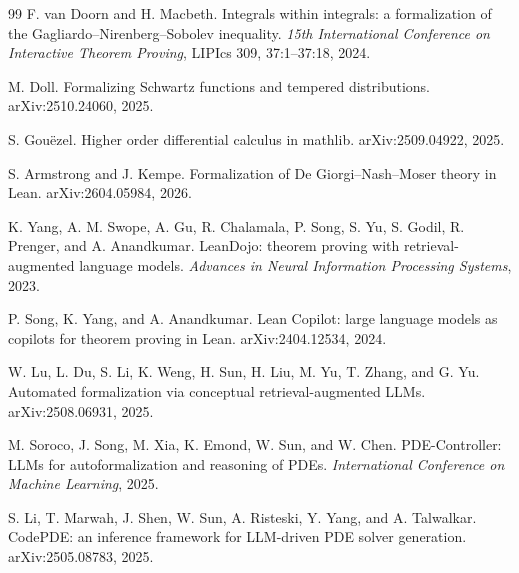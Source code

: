\documentclass[11pt]{article}
\theoremstyle{plain}
\theoremstyle{definition}
\theoremstyle{remark}
\begin{document}
\begin{thebibliography}{99}
F. van Doorn and H. Macbeth.
Integrals within integrals: a formalization of the Gagliardo--Nirenberg--Sobolev inequality.
\emph{15th International Conference on Interactive Theorem Proving}, LIPIcs 309, 37:1--37:18, 2024.

M. Doll.
Formalizing Schwartz functions and tempered distributions.
arXiv:2510.24060, 2025.

S. Gou\"ezel.
Higher order differential calculus in mathlib.
arXiv:2509.04922, 2025.

S. Armstrong and J. Kempe.
Formalization of De Giorgi--Nash--Moser theory in Lean.
arXiv:2604.05984, 2026.

K. Yang, A. M. Swope, A. Gu, R. Chalamala, P. Song, S. Yu, S. Godil, R. Prenger, and A. Anandkumar.
LeanDojo: theorem proving with retrieval-augmented language models.
\emph{Advances in Neural Information Processing Systems}, 2023.

P. Song, K. Yang, and A. Anandkumar.
Lean Copilot: large language models as copilots for theorem proving in Lean.
arXiv:2404.12534, 2024.

W. Lu, L. Du, S. Li, K. Weng, H. Sun, H. Liu, M. Yu, T. Zhang, and G. Yu.
Automated formalization via conceptual retrieval-augmented LLMs.
arXiv:2508.06931, 2025.

M. Soroco, J. Song, M. Xia, K. Emond, W. Sun, and W. Chen.
PDE-Controller: LLMs for autoformalization and reasoning of PDEs.
\emph{International Conference on Machine Learning}, 2025.

S. Li, T. Marwah, J. Shen, W. Sun, A. Risteski, Y. Yang, and A. Talwalkar.
CodePDE: an inference framework for LLM-driven PDE solver generation.
arXiv:2505.08783, 2025.

\end{thebibliography}
\end{document}
